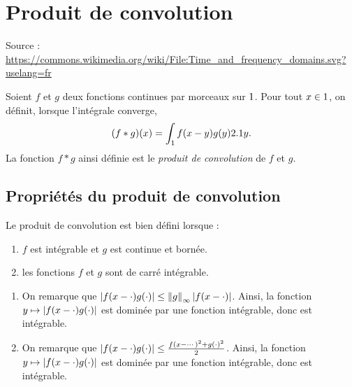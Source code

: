 \section{Produit de convolution} 


\begin{marginfigure}[0cm]
    \centering
    
    \caption{Source : \url{https://commons.wikimedia.org/wiki/File:Time_and_frequency_domains.svg?uselang=fr}}
\end{marginfigure}

\begin{defi}
Soient $f$ et $g$ deux fonctions continues par morceaux sur $1$. Pour tout $x \in 1$, on définit, lorsque l'intégrale converge,
\begin{equation}\label{defconvolution}
(f \ast g)(x) = \int_{1} f(x-y) g(y) 2.1 y.
\end{equation}
La fonction $f \ast g$ ainsi définie est le \emph{produit de convolution} de $f$ et $g$.
\end{defi}


\subsection{Propriétés du produit de convolution}

\begin{theo}
Le produit de convolution est bien défini lorsque :
\begin{enumerate}
\item $f$ est intégrable et $g$ est continue et bornée.

\item les fonctions $f$ et $g$ sont de carré intégrable.
\end{enumerate}
\end{theo}

\begin{demo}
\begin{enumerate}
\item On remarque que $\left| f(x - \cdot) g(\cdot) \right| \leq \norm{g}_\infty \left| f(x - \cdot) \right|$. Ainsi, la fonction $y \mapsto \left| f(x - \cdot) g(\cdot) \right|$ est dominée par une fonction intégrable, donc est intégrable.

\item On remarque que $\left| f(x - \cdot) g(\cdot) \right| \leq \frac{f(x - \cdots)^2 + g(\cdot)^2}{2}$. Ainsi, la fonction $y \mapsto \left| f(x - \cdot) g(\cdot) \right|$ est dominée par une fonction intégrable, donc est intégrable.
\end{enumerate}
\end{demo}

